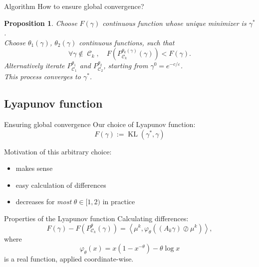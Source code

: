 \documentclass[compress]{beamer}
\newcommand{\scal}[2]{\left\langle #1 , #2 \right\rangle}
\DeclareMathOperator{\Ccal}{\mathcal{C}}
\DeclareMathOperator{\KL}{KL}
\renewcommand{\epsilon}{\varepsilon}
\newtheorem{proposition}{Proposition}
\begin{document}
\begin{frame}{Algorithm}
How to ensure global convergence?
\pause
\begin{proposition}
Choose $F(\gamma)$ continuous function whose unique minimizer is $\gamma^*$.\\
Choose $\theta_1(\gamma)$, $\theta_2(\gamma)$ continuous functions, such that
\begin{equation}\label{eq:cond_theta_k}
\forall \gamma \notin \Ccal_k,\quad
F(P_{\Ccal_k}^{\theta_k(\gamma)}(\gamma)) < F(\gamma).
\end{equation}
\pause
Alternatively iterate $P_{\Ccal_1}^{\theta_1}$ and $P_{\Ccal_2}^{\theta_2}$, starting from $\gamma^0 = e^{-c/\epsilon}$.\\
This process converges to $\gamma^*$.
\end{proposition}
\end{frame}

\subsection{Lyapunov function}
\begin{frame}{Ensuring global convergence}
	Our choice of Lyapunov function:
	\[F(\gamma) := \KL(\gamma^*,\gamma)\]
	\pause
	
	Motivation of this arbitrary choice:
	\begin{itemize}
		\item makes sense
		\item easy calculation of differences
		\item decreases for \emph{most} $\theta \in [1,2)$ in practice
	\end{itemize}
	
\end{frame}

\begin{frame}{Properties of the Lyapunov function}
Calculating differences:
\begin{equation} \label{eq:kl_diff_scal}
F(\gamma) - F(P^\theta_{\Ccal_k}(\gamma)) = 
\scal{\mu^k}{\varphi_\theta \left((A_k \gamma) \oslash \mu^k \right)},
\end{equation}
where
\begin{equation}
\varphi_\theta(x) = x(1-x^{-\theta}) - \theta \log x
\end{equation}
is a real function, applied coordinate-wise.
\end{frame}
\end{document}
